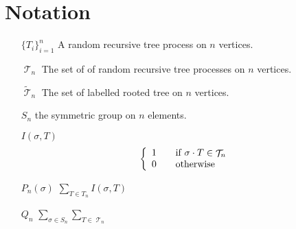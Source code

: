 \documentclass[10pt]{amsart} %
\theoremstyle{definition}
\DeclareMathOperator{\T}{\mathcal{T}}
\begin{document}
\section{Notation}
\begin{itemize}
 \item[$\{T_i\}_{i=1}^{n}$] A random recursive tree process on $n$ vertices.
 \item[$\T_n$] The set of of random recursive tree processes on $n$ vertices.
 \item[$\tilde{\T}_n$] The set of labelled rooted tree on $n$ vertices.
 \item[$S_n$]  the symmetric group on $n$ elements.
 \item[ $ I(\sigma,T)$] $$ \left\{
  \begin{array}{l l}
    1 & \quad \text{if $\sigma \cdot T \in \T_n$}\\
    0 & \quad \text{otherwise}
  \end{array} \right.$$
  \item[$P_n(\sigma)$] $ \sum_{T \in T_n}I(\sigma,T)$
  \item[$Q_n$]  $\sum_{\sigma \in S_n}\sum_{T \in \T_n}$
\end{itemize}
\end{document}
